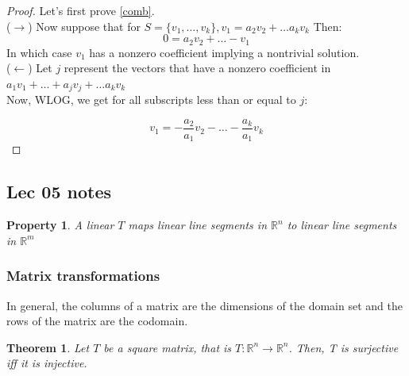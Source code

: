 \documentclass{article}
\newtheorem{thm}{Theorem}[subsection]
\newtheorem{property}{Property}
\numberwithin{equation}{subsection}
\begin{document}
\begin{proof}
Let's first prove \ref{comb}.
\\
($\rightarrow$)
   Now suppose that for $S = \{ v_{1}, \ldots , v_{k}\}, v_{1} = a_{2}v_{2} + \ldots a_{k}v_{k}$ Then:
   $$ 0 = a_{2}v_{2} + \ldots - v_{1}$$
   In which case $v_{1}$ has a nonzero coefficient implying a nontrivial solution. 
   \\
($\leftarrow$)
Let $j$ represent the vectors that have a nonzero coefficient in $a_{1}v_{1} + \ldots + a_{j}v_{j} + \ldots a_{k}v_{k}$
\\
Now, WLOG, we get for all subscripts less than or equal to $j$:

$$ v_{1} = - \frac{a_{2}}{a_{1}}v_{2} - \ldots - \frac{a_{k}}{a_{1}}v_{k}$$
    \tag*{\qedhere}
\end{proof}

\subsection{Lec 05 notes}

\begin{property}
A linear $T$ maps linear line segments in $\mathbb{R}^{n}$ to linear line segments in $\mathbb{R}^{m}$ 
\end{property}

\subsubsection{Matrix transformations}

\begin{tcolorbox}
  In general, the columns of a matrix are the dimensions of the domain set and the rows of the matrix are the codomain. 
\end{tcolorbox}

\begin{thm}
Let $T$ be a square matrix, that is $T:\mathbb{R}^n \to \mathbb{R}^n$. Then, T is surjective iff it is injective. 
\end{thm}
\end{document}
